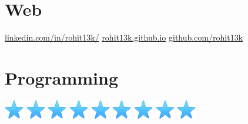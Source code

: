 \documentclass[]{cv-class}
\begin{document}
\begin{aside}
  \section{Web}
 	\vspace{0.10cm}
    \underline{\href{https://www.linkedin.com/in/rohit13k/}{linkedin.com/in/rohit13k/}}
	\vspace{0.10cm}
    \underline{\href{rohit13k.github.io}{rohit13k.github.io}}
	\vspace{0.10cm}
		\underline{\href{https://github.com/rohit13k}{github.com/rohit13k}}
    ~
  \section{Programming}
    {\includegraphics[scale=0.30]{img/star.png}
    \includegraphics[scale=0.30]{img/star.png}
    \includegraphics[scale=0.30]{img/star.png}
    \includegraphics[scale=0.30]{img/star.png}
    \includegraphics[scale=0.30]{img/star.png}}
    {\includegraphics[scale=0.30]{img/star.png}
    \includegraphics[scale=0.30]{img/star.png}
    \includegraphics[scale=0.30]{img/star.png}
    \includegraphics[scale=0.30]{img/star.png}
}
\end{aside}
\end{document}
